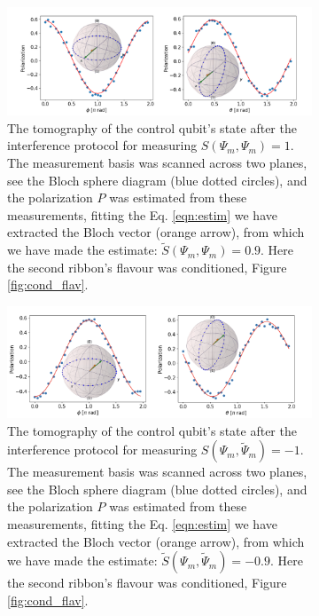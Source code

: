 \documentclass[two column]{article}
\begin{document}
\begin{figure}
    \centering
    \begin{subfigure}{\textwidth}
        \centering
        \includegraphics[width=0.85\linewidth]{Figures/flav_s_plus.pdf}
        \caption{The tomography of the control qubit's state after the interference protocol for measuring $S(\Psi_m, \Psi_m) = 1$. The measurement basis was scanned across two planes, see the Bloch sphere diagram (blue dotted circles), and the polarization $P$ was estimated from these measurements, fitting the Eq. \ref{eqn:estim} we have extracted the Bloch vector (orange arrow), from which we have made the estimate: $\tilde{S}(\Psi_m, \Psi_m) = 0.9$. Here the second ribbon's flavour was conditioned, Figure \ref{fig:cond_flav}.}
        \label{fig:flav_cond_res_plus}
    \end{subfigure}
        \begin{subfigure}{\textwidth}
        \centering
        \includegraphics[width=0.8\linewidth]{Figures/flav_s_minus.pdf}
        \caption{The tomography of the control qubit's state after the interference protocol for measuring $S(\Psi_m, \tilde{\Psi}_m) = -1$. The measurement basis was scanned across two planes, see the Bloch sphere diagram (blue dotted circles), and the polarization $P$ was estimated from these measurements, fitting the Eq. \ref{eqn:estim} we have extracted the Bloch vector (orange arrow), from which we have made the estimate: $\tilde{S}(\Psi_m, \tilde{\Psi}_m) = -0.9$. Here the second ribbon's flavour was conditioned, Figure \ref{fig:cond_flav}.}
        \label{fig:flav_cond_res_minus}
    \end{subfigure}
    \begin{subfigure}{\textwidth}

\end{subfigure}
\end{figure}
\end{document}

